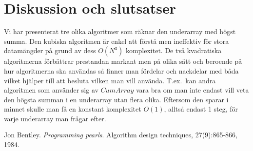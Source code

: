 \documentclass[a4paper,12pt]{article} \usepackage[swedish]{babel}
\begin{document}
                \section{Diskussion och slutsatser} \label{sec:disk} Vi har
                presenterat tre olika algoritmer som räknar den underarray
                med högst summa. Den kubiska algoritmen är enkel att förstå
                men ineffektiv för stora datamängder på grund av dess
                $O\left(N^3\right)$ komplexitet. De två kvadratiska
                algoritmerna förbättrar prestandan markant men på olika
                sätt och beroende på hur algoritmerna ska användas så
                finner man fördelar och nackdelar med båda vilket hjälper
                till att besluta vilken man vill använda. T.ex.~kan andra
                algoritmen som använder sig av $CumArray$ vara bra om man
                inte endast vill veta den högsta summan i en underarray
                utan flera olika. Eftersom den sparar i minnet skulle man
                få en konstant komplexitet $O\left(1\right)$, alltså endast
                1 steg, för varje underarray man frågar efter.
                \begin{thebibliography}{99}
                     Jon Bentley.
                        \textit{Programming pearls}.  Algorithm design
                        techniques, 27(9):865-866, 1984.
                \end{thebibliography}
            
\end{document}
